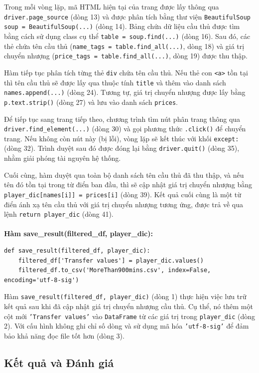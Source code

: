 \documentclass[12pt]{report}
\begin{document}
{Trong mỗi vòng lặp, mã HTML hiện tại của trang được lấy thông qua \texttt{driver.page\_source} (dòng 13) và được phân tích bằng thư viện \texttt{BeautifulSoup} \texttt{soup = BeautifulSoup(...)} (dòng 14). Bảng chứa dữ liệu cầu thủ được tìm bằng cách sử dụng class cụ thể \texttt{table = soup.find(...)} (dòng 16). Sau đó, các thẻ chứa tên cầu thủ (\texttt{name\_tags = table.find\_all(...)}, dòng 18) và giá trị chuyển nhượng (\texttt{price\_tags = table.find\_all(...)}, dòng 19) được thu thập.

Hàm tiếp tục phân tích từng thẻ \texttt{div} chứa tên cầu thủ. Nếu thẻ con \texttt{<a>} tồn tại thì tên cầu thủ sẽ được lấy qua thuộc tính \texttt{title} và thêm vào danh sách \texttt{names.append(...)} (dòng 24). Tương tự, giá trị chuyển nhượng được lấy bằng \texttt{p.text.strip()} (dòng 27) và lưu vào danh sách \texttt{prices}.

Để tiếp tục sang trang tiếp theo, chương trình tìm nút phân trang thông qua \texttt{driver.find\_element(...)} (dòng 30) và gọi phương thức \texttt{.click()} để chuyển trang. Nếu không còn nút này (bị lỗi), vòng lặp sẽ kết thúc với khối \texttt{except:} (dòng 32). Trình duyệt sau đó được đóng lại bằng \texttt{driver.quit()} (dòng 35), nhằm giải phóng tài nguyên hệ thống.

Cuối cùng, hàm duyệt qua toàn bộ danh sách tên cầu thủ đã thu thập, và nếu tên đó tồn tại trong từ điển ban đầu, thì sẽ cập nhật giá trị chuyển nhượng bằng \texttt{player\_dic[names[i]] = prices[i]} (dòng 39). Kết quả cuối cùng là một từ điển ánh xạ tên cầu thủ với giá trị chuyển nhượng tương ứng, được trả về qua lệnh \texttt{return player\_dic} (dòng 41).
\\\\
\textbf{Hàm save\_result(filtered\_df, player\_dic):}\\
\begin{lstlisting}
def save_result(filtered_df, player_dic):
    filtered_df['Transfer values'] = player_dic.values()
    filtered_df.to_csv('MoreThan900mins.csv', index=False, encoding='utf-8-sig')
\end{lstlisting}
Hàm \texttt{save\_result(filtered\_df, player\_dic)} (dòng 1) thực hiện việc lưu trữ kết quả sau khi đã cập nhật giá trị chuyển nhượng cầu thủ. Cụ thể, nó thêm một cột mới \texttt{'Transfer values'} vào \texttt{DataFrame} từ các giá trị trong \texttt{player\_dic} (dòng 2).  Với cấu hình không ghi chỉ số dòng và sử dụng mã hóa \texttt{'utf-8-sig'} để đảm bảo khả năng đọc file tốt hơn (dòng 3).

\subsection{Kết quả và Đánh giá}
}
\end{document}
